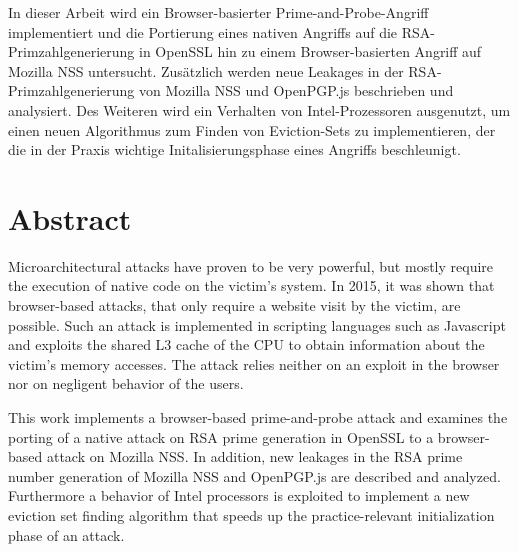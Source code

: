 In dieser Arbeit wird ein Browser-basierter Prime-and-Probe-Angriff implementiert und die Portierung eines nativen Angriffs auf die RSA-Primzahlgenerierung \cite{RSAKeyGeneration2} in OpenSSL hin zu einem Browser-basierten Angriff auf Mozilla NSS untersucht.
Zusätzlich werden neue Leakages in der RSA-Primzahlgenerierung von Mozilla NSS und OpenPGP.js beschrieben und analysiert.
Des Weiteren wird ein Verhalten von Intel-Prozessoren ausgenutzt, um einen neuen Algorithmus zum Finden von Eviction-Sets zu implementieren, der die in der Praxis wichtige Initalisierungsphase eines Angriffs beschleunigt. 


{\let\cleardoublepage\relax \chapter*{Abstract}}

Microarchitectural attacks have proven to be very powerful, but mostly require the execution of native code on the victim's system. 
In 2015, it was shown that browser-based attacks, that only require a website visit by the victim, are possible.
Such an attack is implemented in scripting languages such as Javascript and exploits the shared L3 cache of the CPU to obtain information about the victim's memory accesses.
The attack relies neither on an exploit in the browser nor on negligent behavior of the users.

This work implements a browser-based prime-and-probe attack and examines the porting of a native attack on RSA prime generation in OpenSSL to a browser-based attack on Mozilla NSS.
In addition, new leakages in the RSA prime number generation of Mozilla NSS and OpenPGP.js are described and analyzed.
Furthermore a behavior of Intel processors is exploited to implement a new eviction set finding algorithm that speeds up the practice-relevant initialization phase of an attack.